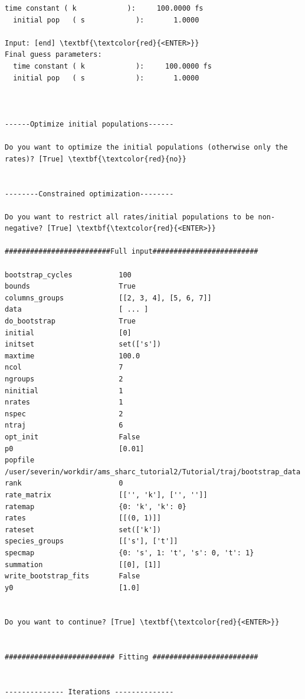 \documentclass[a4paper,11pt,DIV=15,openany]{scrbook}
\begin{document}
\begin{oframed}
\begin{Verbatim}[commandchars=\\\{\}]
  time constant ( k            ):     100.0000 fs
  initial pop   ( s            ):       1.0000

Input: [end] \textbf{\textcolor{red}{<ENTER>}}
Final guess parameters:
  time constant ( k            ):     100.0000 fs
  initial pop   ( s            ):       1.0000



------Optimize initial populations------

Do you want to optimize the initial populations (otherwise only the rates)? [True] \textbf{\textcolor{red}{no}}


--------Constrained optimization--------

Do you want to restrict all rates/initial populations to be non-negative? [True] \textbf{\textcolor{red}{<ENTER>}}

#########################Full input#########################

bootstrap_cycles           100
bounds                     True
columns_groups             [[2, 3, 4], [5, 6, 7]]
data                       [ ... ]
do_bootstrap               True
initial                    [0]
initset                    set(['s'])
maxtime                    100.0
ncol                       7
ngroups                    2
ninitial                   1
nrates                     1
nspec                      2
ntraj                      6
opt_init                   False
p0                         [0.01]
popfile                    /user/severin/workdir/ams_sharc_tutorial2/Tutorial/traj/bootstrap_data
rank                       0
rate_matrix                [['', 'k'], ['', '']]
ratemap                    {0: 'k', 'k': 0}
rates                      [[(0, 1)]]
rateset                    set(['k'])
species_groups             [['s'], ['t']]
specmap                    {0: 's', 1: 't', 's': 0, 't': 1}
summation                  [[0], [1]]
write_bootstrap_fits       False
y0                         [1.0]


Do you want to continue? [True] \textbf{\textcolor{red}{<ENTER>}}


########################## Fitting #########################


-------------- Iterations --------------


\end{Verbatim}
\end{oframed}
\end{document}
